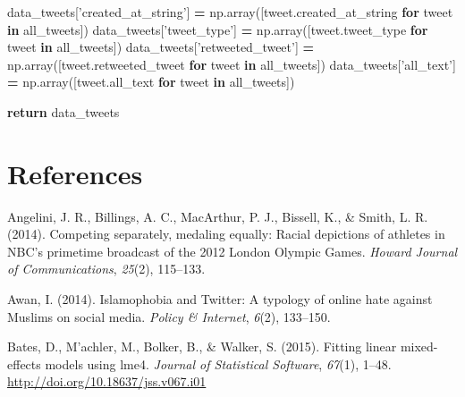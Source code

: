 \documentclass[12pt,twoside]{reedthesis}
\newenvironment{Shaded}{\begin{snugshade}}{\end{snugshade}}
\newcommand{\KeywordTok}[1]{\textcolor[rgb]{0.13,0.29,0.53}{\textbf{#1}}}
\newcommand{\StringTok}[1]{\textcolor[rgb]{0.31,0.60,0.02}{#1}}
\newcommand{\ControlFlowTok}[1]{\textcolor[rgb]{0.13,0.29,0.53}{\textbf{#1}}}
\newcommand{\OperatorTok}[1]{\textcolor[rgb]{0.81,0.36,0.00}{\textbf{#1}}}
\newcommand{\NormalTok}[1]{#1}
\begin{document}
\begin{Shaded}
\begin{Highlighting}[]
\NormalTok{    data_tweets[}\StringTok{'created_at_string'}\NormalTok{] }\OperatorTok{=}\NormalTok{ np.array([tweet.created_at_string }
    \ControlFlowTok{for}\NormalTok{ tweet }\KeywordTok{in}\NormalTok{ all_tweets])}
\NormalTok{    data_tweets[}\StringTok{'tweet_type'}\NormalTok{] }\OperatorTok{=}\NormalTok{ np.array([tweet.tweet_type }
    \ControlFlowTok{for}\NormalTok{ tweet }\KeywordTok{in}\NormalTok{ all_tweets])}
\NormalTok{    data_tweets[}\StringTok{'retweeted_tweet'}\NormalTok{] }\OperatorTok{=}\NormalTok{ np.array([tweet.retweeted_tweet }
    \ControlFlowTok{for}\NormalTok{ tweet }\KeywordTok{in}\NormalTok{ all_tweets])}
\NormalTok{    data_tweets[}\StringTok{'all_text'}\NormalTok{] }\OperatorTok{=}\NormalTok{ np.array([tweet.all_text }
    \ControlFlowTok{for}\NormalTok{ tweet }\KeywordTok{in}\NormalTok{ all_tweets])}
    
    
    \ControlFlowTok{return}\NormalTok{ data_tweets}
\end{Highlighting}
\end{Shaded}
\normalsize

\backmatter

\chapter*{References}\label{references}


\noindent

\setlength{\parindent}{-0.20in} \setlength{\leftskip}{0.20in}
\setlength{\parskip}{8pt}

\hypertarget{refs}{}
\hypertarget{ref-angelini2014competing}{}
Angelini, J. R., Billings, A. C., MacArthur, P. J., Bissell, K., \&
Smith, L. R. (2014). Competing separately, medaling equally: Racial
depictions of athletes in NBC's primetime broadcast of the 2012 London
Olympic Games. \emph{Howard Journal of Communications}, \emph{25}(2),
115--133.

\hypertarget{ref-awan2014islamophobia}{}
Awan, I. (2014). Islamophobia and Twitter: A typology of online hate
against Muslims on social media. \emph{Policy \& Internet}, \emph{6}(2),
133--150.

\hypertarget{ref-lme4}{}
Bates, D., M'achler, M., Bolker, B., \& Walker, S. (2015). Fitting
linear mixed-effects models using lme4. \emph{Journal of Statistical
Software}, \emph{67}(1), 1--48.
\url{http://doi.org/10.18637/jss.v067.i01}
\end{document}
